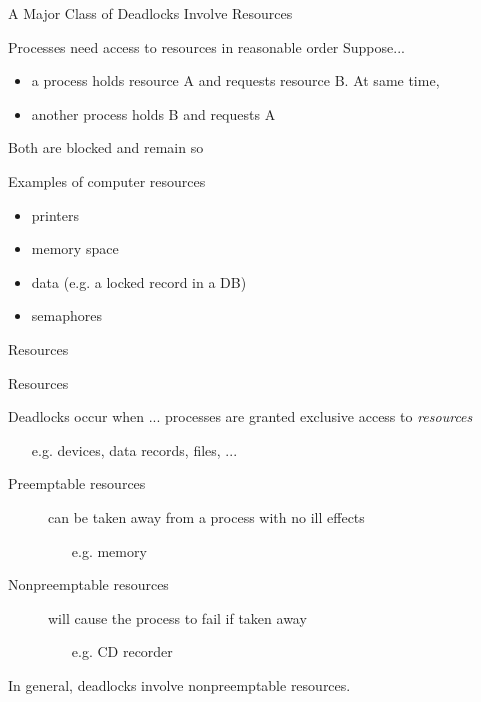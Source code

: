 \begin{frame}{A Major Class of Deadlocks Involve Resources}
  \begin{block}{Processes need access to resources in reasonable order}
    Suppose...
    \begin{itemize}
    \item a process holds resource A and requests resource B. At same time,
    \item another process holds B and requests A
    \end{itemize}
    Both are blocked and remain so
  \end{block}
  \begin{block}{Examples of computer resources}
    \begin{itemize}
    \item printers
    \item memory space
    \item data (e.g. a locked record in a DB)
    \item semaphores
    \end{itemize}
  \end{block}
\end{frame}

\begin{frame}{Resources}
  \centering
  \mode<beamer>{ \texttt{[image: deadlock-resource]} }%
\end{frame}

\begin{frame}{Resources}
  \begin{block}{Deadlocks occur when ...}
    processes are granted exclusive access to \emph{resources}
    \begin{itemize}
    \item[e.g.] devices, data records, files, ...
    \end{itemize}
  \end{block}
  \begin{description}
  \item[Preemptable resources] can be taken away from a process with no ill effects
    \begin{itemize}
    \item[e.g.] memory
    \end{itemize}
  \item[Nonpreemptable resources] will cause the process to fail if taken away
    \begin{itemize}
    \item[e.g.] CD recorder
    \end{itemize}
  \end{description}
  In general, deadlocks involve nonpreemptable resources.
\end{frame}

